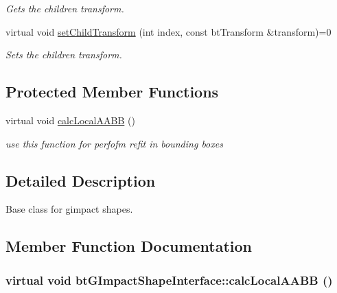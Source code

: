\begin{Indent}{\bf }
\begin{CompactItemize}
\begin{CompactList}\small\item\em Gets the children transform. \item\end{CompactList}\item 
virtual void \hyperlink{classbt_g_impact_shape_interface_83392f97bd7dfeb71ccdce6913a465b0}{setChildTransform} (int index, const btTransform \&transform)=0
\begin{CompactList}\small\item\em Sets the children transform. \item\end{CompactList}\end{CompactItemize}
\end{Indent}
\subsection*{Protected Member Functions}
\begin{CompactItemize}
\item 
virtual void \hyperlink{classbt_g_impact_shape_interface_1712a4613e20aa9249514dcd97f0a086}{calcLocalAABB} ()
\begin{CompactList}\small\item\em use this function for perfofm refit in bounding boxes \item\end{CompactList}\end{CompactItemize}


\subsection{Detailed Description}
Base class for gimpact shapes. 

\subsection{Member Function Documentation}
\hypertarget{classbt_g_impact_shape_interface_1712a4613e20aa9249514dcd97f0a086}{
\subsubsection[calcLocalAABB]{\setlength{\rightskip}{0pt plus 5cm}virtual void btGImpactShapeInterface::calcLocalAABB ()}}
\label{classbt_g_impact_shape_interface_1712a4613e20aa9249514dcd97f0a086}


